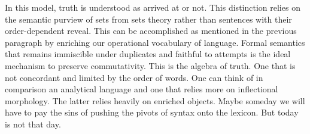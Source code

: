 \documentclass[12pt]{article}
\begin{document}
In this model, truth is understood as arrived at or not. This distinction
relies on the semantic purview of sets from sets theory rather than sentences
with their order-dependent reveal. This can be accomplished as mentioned in the
previous paragraph by enriching our operational vocabulary of language. Formal
semantics that remains immiscible under duplicates and faithful to attempts is
the ideal mechanism to preserve commutativity. This is the algebra of truth. One
that is not concordant and limited by the order of words. One can think of in
comparison an analytical language and one that relies more on inflectional
morphology. The latter relies heavily on enriched objects. Maybe someday we will
have to pay the sins of pushing the pivots of syntax onto the lexicon. But today
is not that day.
\end{document}
